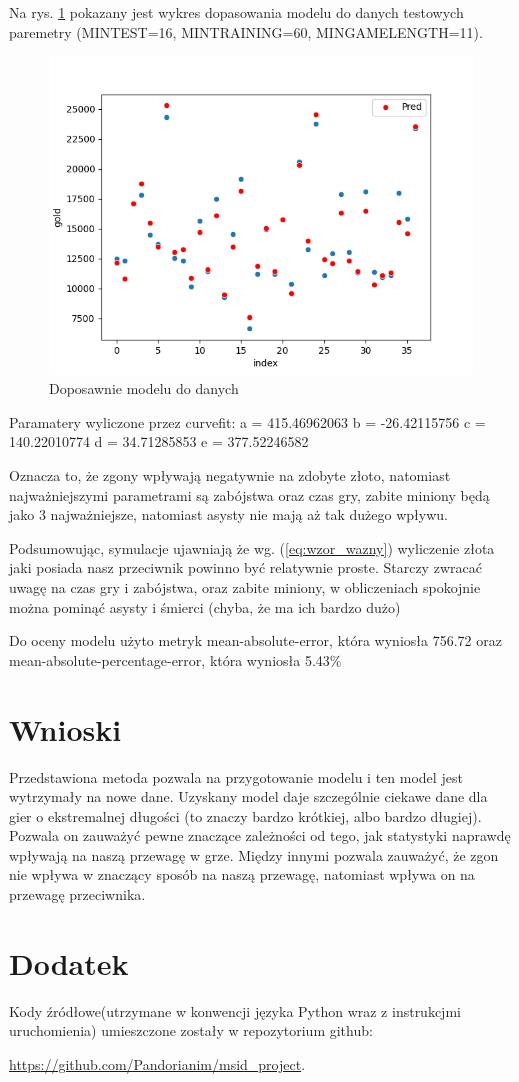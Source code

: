 \documentclass[10pt]{article}
\begin{document}
Na rys. \ref{fig:korelacje} pokazany jest wykres dopasowania modelu do danych testowych paremetry (MINTEST=16, MINTRAINING=60, MINGAMELENGTH=11). \newline 
\begin{figure}[!hbt]
\begin{center}
\includegraphics[width=0.8\linewidth]{rys1.png}
\caption{Doposawnie modelu do danych}
\label{fig:korelacje}
\end{center}
\end{figure}


Paramatery wyliczone przez curvefit: a = 415.46962063 b = -26.42115756 c = 140.22010774  d = 34.71285853 e = 377.52246582

Oznacza to, że zgony wpływają negatywnie na zdobyte złoto, natomiast najważniejszymi parametrami są zabójstwa oraz czas gry, zabite miniony będą jako 3 najważniejsze, natomiast asysty nie mają aż tak dużego wpływu.

Podsumowując, symulacje ujawniają że wg. (\ref{eq:wzor_wazny}) wyliczenie złota jaki posiada nasz przeciwnik powinno być relatywnie proste. Starczy zwracać uwagę na czas gry i zabójstwa, oraz zabite miniony, w obliczeniach spokojnie można pominąć asysty i śmierci (chyba, że ma ich bardzo dużo)

Do oceny modelu użyto metryk mean-absolute-error, która wyniosła 756.72 oraz mean-absolute-percentage-error, która wyniosła 5.43\%

\section{Wnioski}
Przedstawiona metoda pozwala na przygotowanie modelu i ten model jest wytrzymały na nowe dane. Uzyskany model daje szczególnie ciekawe dane dla gier o ekstremalnej długości (to znaczy bardzo krótkiej, albo bardzo długiej). Pozwala on zauważyć pewne znaczące zależności od tego, jak statystyki naprawdę wpływają na naszą przewagę w grze. Między innymi pozwala zauważyć, że zgon nie wpływa w znaczący sposób na naszą przewagę, natomiast wpływa on na przewagę przeciwnika.

\appendix
\section{Dodatek}
Kody źródłowe(utrzymane w konwencji języka Python wraz z instrukcjmi uruchomienia) umieszczone zostały w repozytorium github:

\noindent \url{https://github.com/Pandorianim/msid_project}.
\end{document}
